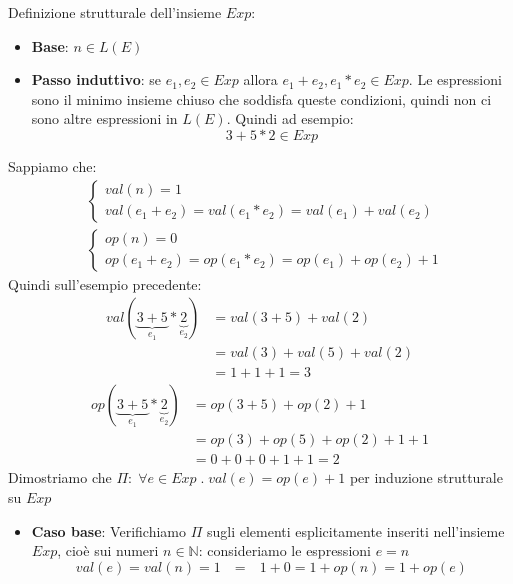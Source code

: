 \documentclass[a4paper]{article}
\begin{document}
\begin{exercise}
  Definizione strutturale dell'insieme \( Exp \):
  \begin{itemize}
    \item \textbf{Base}: \( n \in L(E) \)
    \item \textbf{Passo induttivo}: se \( e_1, e_2 \in Exp \) allora
      \( e_1 + e_2, e_1 * e_2 \in Exp \).
      Le espressioni sono il minimo insieme chiuso che soddisfa queste condizioni,
      quindi non ci sono altre espressioni in \( L(E) \). Quindi ad esempio:
      \[
        3 + 5 * 2 \in Exp
      \] 
  \end{itemize}
  Sappiamo che:
  \[
    \begin{aligned}
      &\begin{cases}
        val(n) = 1 \\
        val(e_1 + e_2) = val(e_1 * e_2) = val(e_1) + val(e_2)
      \end{cases} \\
      &\begin{cases}
        op(n) = 0 \\
        op(e_1 + e_2) = op(e_1 * e_2) = op(e_1) + op(e_2) + 1
      \end{cases}
    \end{aligned}
  \] 
  Quindi sull'esempio precedente:
  \[
    \begin{aligned}
      val(\underbrace{3 + 5}_{e_1} * \underbrace{2}_{e_2}) &= val(3 + 5) + val(2) \\
                                                           &= val(3) + val(5) + val(2) \\
                                                           &= 1 + 1 + 1 = 3
    \end{aligned}
  \] 
  \[
    \begin{aligned}
      op(\underbrace{3 + 5}_{e_1} * \underbrace{2}_{e_2}) &= op(3 + 5) + op(2) + 1 \\
                                                          &= op(3) + op(5) + op(2) + 1 + 1 \\
                                                          &= 0 + 0 + 0 + 1 + 1 = 2
    \end{aligned}
  \] 
  Dimostriamo che \( \Pi:\; \forall e \in Exp \;.\; val(e) = op(e) + 1 \) per induzione
  strutturale su \( Exp \) 
  \begin{itemize}
    \item \textbf{Caso base}: Verifichiamo \( \Pi  \) sugli elementi esplicitamente
      inseriti nell'insieme \( Exp \), cioè sui numeri \( n \in \mathbb{N}\):
      consideriamo le espressioni \( e = n \) 
      \[
        val(e) = val(n) = 1 \quad \textbf{=} \quad 1 + 0 = 1 + op(n) = 1 + op(e)
      \] 


\end{itemize}
\end{exercise}
\end{document}
